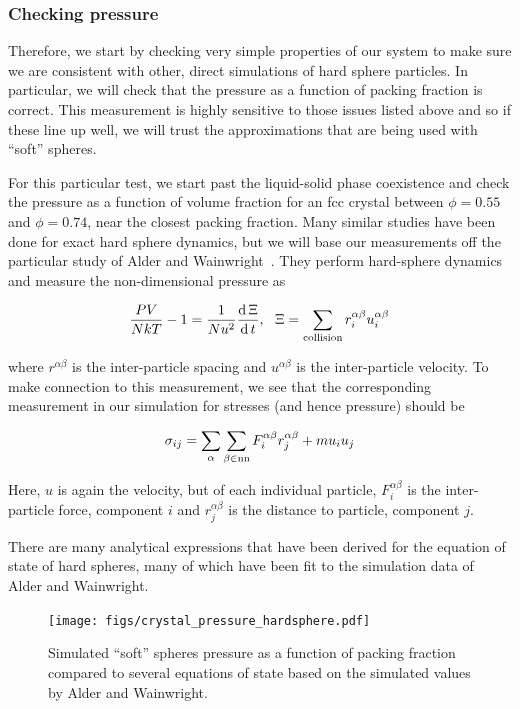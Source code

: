 \documentclass[twocolumn,amsmath,amssymb]{revtex4}
\newcommand*\diff{\mathop{}\!\mathrm{d}}
\begin{document}
\subsubsection{Checking pressure}


Therefore, we start by checking very simple properties of our system to make
sure we are consistent with other, direct simulations of hard sphere particles.
In particular, we will check that the pressure as a function of packing
fraction is correct.  This measurement is highly sensitive to those issues
listed above and so if these line up well, we will trust the approximations
that are being used with ``soft'' spheres.

For this particular test, we start past the liquid-solid phase coexistence and
check the pressure as a function of volume fraction for an fcc crystal between
$\phi = 0.55$ and $\phi = 0.74$, near the closest packing fraction.  Many
similar studies have been done for exact hard sphere dynamics, but we will base
our measurements off the particular study of Alder and
Wainwright~\cite{alder1959studies, alder1960studies}. They perform hard-sphere
dynamics and measure the non-dimensional pressure as 

\begin{equation}
    \frac{PV}{NkT} - 1 = \frac{1}{N u^2} \frac{\diff\, \Xi}{\diff\, t}, \,\,\,\, \Xi = \sum_{\rm{collision}} r^{\alpha\beta}_i u^{\alpha\beta}_i
\end{equation}

where $r^{\alpha\beta}$ is the inter-particle spacing and $u^{\alpha\beta}$ is
the inter-particle velocity.  To make connection to this measurement, we see
that the corresponding measurement in our simulation for stresses (and hence
pressure) should be

\begin{equation}
    \sigma_{ij} = \sum_{\alpha} \sum_{\beta \in \rm{nn}} F^{\alpha\beta}_{i}r^{\alpha\beta}_{j} + m u_i u_j
\end{equation}

Here, $u$ is again the velocity, but of each individual particle,
$F^{\alpha\beta}_i$ is the inter-particle force, component $i$ and
$r^{\alpha\beta}_j$ is the distance to particle, component $j$.

There are many analytical expressions that have been derived for the equation
of state of hard spheres, many of which have been fit to the simulation data of
Alder and Wainwright.  

\begin{figure}
    \texttt{[image: figs/crystal\_pressure\_hardsphere.pdf]}

    \caption{Simulated ``soft'' spheres pressure as a function of packing fraction
    compared to several equations of state based on the simulated values by Alder and Wainwright.}
    \label{fig:crystal_pressure_hs}
\end{figure}
\end{document}
